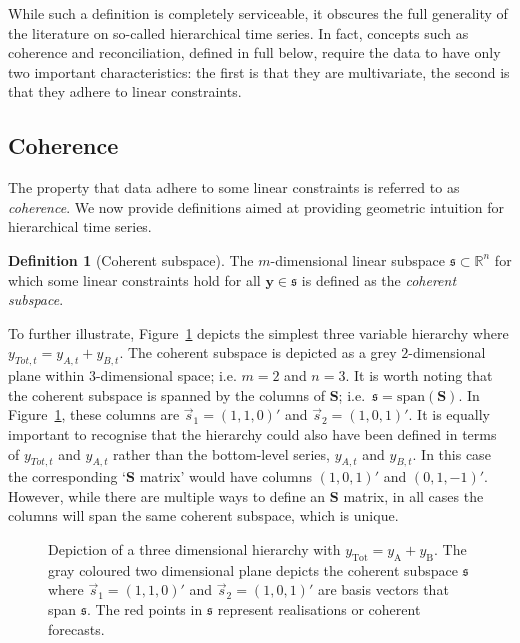 \documentclass[12pt]{article}
\theoremstyle{definition}
\newtheorem{definition}{Definition}[section]
\begin{document}
While such a definition is completely serviceable, it obscures the full generality of the literature on so-called hierarchical time series. In fact, concepts such as coherence and reconciliation, defined in full below, require the data to have only two important characteristics: the first is that they are multivariate, the second is that they adhere to linear constraints.

\subsection{Coherence}\label{sec:cohpointf}

The property that data adhere to some linear constraints is referred to as \emph{coherence}. We now provide definitions aimed at providing geometric intuition for hierarchical time series.

\begin{definition}[Coherent subspace]\label{def:cohspace}
   The $m$-dimensional linear subspace $\mathfrak{s}\subset \mathbb{R}^n$ for which some linear constraints hold for all $\bm{y}\in\mathfrak{s}$ is defined as the \emph{coherent subspace}.
\end{definition}

To further illustrate, Figure~\ref{fig:3D_hierarchy} depicts the simplest three variable hierarchy where $y_{Tot,t}=y_{A,t}+y_{B,t}$. The coherent subspace is depicted as a grey $2$-dimensional plane within $3$-dimensional space; i.e. $m=2$ and $n=3$. It is worth noting that the coherent subspace is spanned by the columns of $\bm{S}$; i.e.\ $\mathfrak{s}=\text{span}(\bm{S})$. In Figure~\ref{fig:3D_hierarchy}, these columns are $\vec{s}_1=(1,1,0)'$ and $\vec{s}_2=(1,0,1)'$. It is equally important to recognise that the hierarchy could also have been defined in terms of $y_{Tot,t}$ and $y_{A,t}$ rather than the bottom-level series, $y_{A,t}$ and $y_{B,t}$. In this case the corresponding `$\bm{S}$ matrix' would have columns $(1,0,1)'$ and $(0,1,-1)'$. However, while there are multiple ways to define an $\bm{S}$ matrix, in all cases the columns will span the same coherent subspace, which is unique.

\begin{figure}[!hbt]
   \centering
   \vspace{-0.9cm}
   \small
   \resizebox{0.8\linewidth}{!}{
     
   }
   \caption{Depiction of a three dimensional hierarchy with $y_{\text{Tot}} = y_{\text{A}} + y_{\text{B}}$. The gray coloured two dimensional plane depicts the coherent subspace $\mathfrak{s}$ where $\vec{s}_1 = (1,1,0)'$ and $\vec{s}_2 = (1, 0, 1)'$ are basis vectors that span $\mathfrak{s}$. The red points in $\mathfrak{s}$ represent realisations or coherent forecasts.}\label{fig:3D_hierarchy}
\end{figure}
\end{document}
